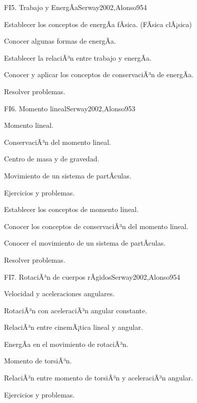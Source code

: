 \begin{syllabus}
\begin{unit}{FI5. Trabajo y EnergÃ­a}{Serway2002,Alonso95}{4}
   \begin{unitgoals}
      \item Establecer los conceptos de energÃ­a fÃ­sica. (FÃ­sica clÃ¡sica)
      \item Conocer algunas formas de energÃ­a.
      \item Establecer la relaciÃ³n entre trabajo y energÃ­a.
      \item Conocer y aplicar los conceptos de conservaciÃ³n de energÃ­a.
      \item Resolver problemas.
   \end{unitgoals}
\end{unit}

\begin{unit}{FI6. Momento lineal}{Serway2002,Alonso95}{3}
\begin{topics}
      \item Momento lineal.
      \item ConservaciÃ³n del momento lineal.
      \item Centro de masa y de gravedad.
      \item Movimiento de un sistema de partÃ­culas.
      \item Ejercicios y problemas.
  \end{topics}

   \begin{unitgoals}
      \item Establecer los conceptos de momento lineal.
      \item Conocer los conceptos de conservaciÃ³n del momento lineal.
      \item Conocer el movimiento de un sistema de partÃ­culas.
      \item Resolver problemas.
   \end{unitgoals}
\end{unit}

\begin{unit}{FI7. RotaciÃ³n de cuerpos rÃ­gidos}{Serway2002,Alonso95}{4}
\begin{topics}
      \item Velocidad y aceleraciones angulares.
      \item RotaciÃ³n con aceleraciÃ³n angular constante.
      \item RelaciÃ³n entre cinemÃ¡tica lineal y angular.
      \item EnergÃ­a en el movimiento de rotaciÃ³n.
      \item Momento de torsiÃ³n.
      \item RelaciÃ³n entre momento de torsiÃ³n y aceleraciÃ³n angular.
      \item Ejercicios y problemas.
   \end{topics}


\end{unit}
\end{syllabus}
